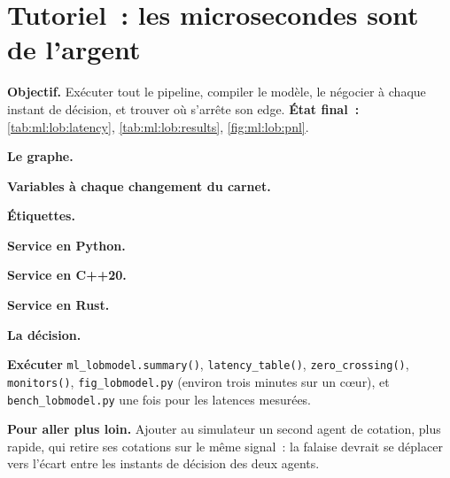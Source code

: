 \section{Tutoriel~: les microsecondes sont de l'argent}\label{tut:ml:build-an-order-book-model-end-to-end:tut}

\begin{tutorial}
\textbf{Objectif.} Exécuter tout le pipeline, compiler le modèle, le négocier à chaque instant de décision, et trouver où s'arrête son edge.
\textbf{État final~:} \cref{tab:ml:lob:latency}, \cref{tab:ml:lob:results}, \cref{fig:ml:lob:pnl}.
\begin{tutsteps}
\item \textbf{Le graphe.}
\label{lst:ml:lob:graph}
\item \textbf{Variables à chaque changement du carnet.}
\label{lst:ml:lob:onbook}
\item \textbf{Étiquettes.}
\label{lst:ml:lob:data}
\item \textbf{Service en Python.}
\label{lst:ml:lob:predict}
\item \textbf{Service en C++20.}
\label{lst:ml:lob:cpp}
\item \textbf{Service en Rust.}
\label{lst:ml:lob:rust}
\item \textbf{La décision.}
\label{lst:ml:lob:act}
\item \textbf{Exécuter} \texttt{ml\_lobmodel.summary()}, \texttt{latency\_table()}, \texttt{zero\_crossing()}, \texttt{monitors()},
\texttt{fig\_lobmodel.py} (environ trois minutes sur un cœur), et \texttt{bench\_lobmodel.py} une fois pour les latences mesurées.
\end{tutsteps}
\textbf{Pour aller plus loin.} Ajouter au simulateur un second agent de cotation, plus rapide, qui retire ses cotations sur le même signal~: la falaise
devrait se déplacer vers l'écart entre les instants de décision des deux agents.
\end{tutorial}

